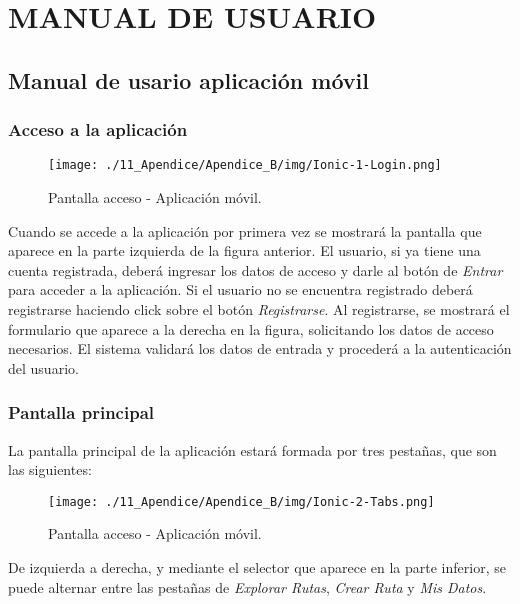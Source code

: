 \chapter[Manual de usuario]{
  \label{chp:manualdeusuario}
  MANUAL DE USUARIO
}
\thispagestyle{numberingStyle}
\pagestyle{numberingStyle}


\section{Manual de usario aplicación móvil}

\subsection*{Acceso a la aplicación}
\begin{figure}[H]
\centering
\texttt{[image: ./11\_Apendice/Apendice\_B/img/Ionic-1-Login.png]}
\caption{Pantalla acceso - Aplicación móvil.}
\end{figure}

Cuando se accede a la aplicación por primera vez se mostrará la pantalla que aparece en la parte izquierda de la figura anterior. El usuario, si ya tiene una cuenta registrada, deberá ingresar los datos de acceso y darle al botón de \textit{Entrar} para acceder a la aplicación. Si el usuario no se encuentra registrado deberá registrarse haciendo click sobre el botón \textit{Registrarse}. Al registrarse, se mostrará el formulario que aparece a la derecha en la figura, solicitando los datos de acceso necesarios. El sistema validará los datos de entrada y procederá a la autenticación del usuario.


\subsection*{Pantalla principal}

La pantalla principal de la aplicación estará formada por tres pestañas, que son las siguientes:


\begin{figure}[H]
\centering
\texttt{[image: ./11\_Apendice/Apendice\_B/img/Ionic-2-Tabs.png]}
\caption{Pantalla acceso - Aplicación móvil.}
\end{figure}

De izquierda a derecha, y mediante el selector que aparece en la parte inferior, se puede alternar entre las pestañas de \textit{Explorar Rutas}, \textit{Crear Ruta} y \textit{Mis Datos}.


